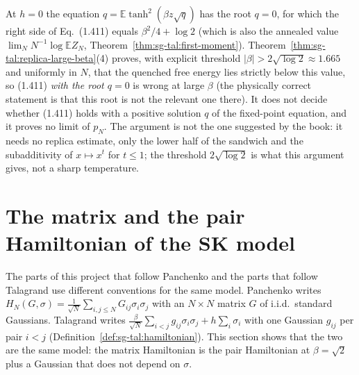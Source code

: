 \begin{remark}\label{rem:sg-tal:replica-large-beta-scope}
At $h=0$ the equation $q=\mathbb E\tanh^2(\beta z\sqrt q)$ has the root $q=0$, for which the right side of Eq.~(1.411) equals $\beta^2/4+\log2$ (which is also the annealed value $\lim_N N^{-1}\log\mathbb EZ_N$, Theorem~\ref{thm:sg-tal:first-moment}).
Theorem~\ref{thm:sg-tal:replica-large-beta}(4) proves, with explicit threshold $|\beta|>2\sqrt{\log2}\approx1.665$ and uniformly in $N$, that the quenched free energy lies strictly below this value, so (1.411) \emph{with the root $q=0$} is wrong at large $\beta$ (the physically correct statement is that this root is not the relevant one there).
It does not decide whether (1.411) holds with a positive solution $q$ of the fixed-point equation, and it proves no limit of $p_N$.
The argument is not the one suggested by the book: it needs no replica estimate, only the lower half of the sandwich and the subadditivity of $x\mapsto x^t$ for $t\le1$; the threshold $2\sqrt{\log2}$ is what this argument gives, not a sharp temperature.
\end{remark}

\section{The matrix and the pair Hamiltonian of the SK model}\label{sec:sg-tal:hamiltonian-bridge}

The parts of this project that follow Panchenko and the parts that follow Talagrand use different conventions for the same model.
Panchenko writes $H_N(G,\sigma)=\frac1{\sqrt N}\sum_{i,j\le N}G_{ij}\sigma_i\sigma_j$ with an $N\times N$ matrix $G$ of i.i.d.\ standard Gaussians.
Talagrand writes $\frac{\beta}{\sqrt N}\sum_{i<j}g_{ij}\sigma_i\sigma_j+h\sum_i\sigma_i$ with one Gaussian $g_{ij}$ per pair $i<j$ (Definition~\ref{def:sg-tal:hamiltonian}).
This section shows that the two are the same model: the matrix Hamiltonian is the pair Hamiltonian at $\beta=\sqrt2$ plus a Gaussian that does not depend on $\sigma$.

